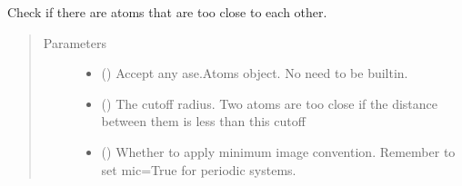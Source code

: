\documentclass[letterpaper,10pt,english]{sphinxmanual}
\begin{document}

\begin{fulllineitems}
\label{\detokenize{utilities:acat.utilities.atoms_too_close}}
Check if there are atoms that are too close to each other.
\begin{quote}\begin{description}
\item[{Parameters}] \leavevmode\begin{itemize}
\item {} 
 () \textendash{} Accept any ase.Atoms object. No need to be built\sphinxhyphen{}in.

\item {} 
 (\sphinxstyleliteralemphasis{\sphinxupquote{, }}) \textendash{} The cutoff radius. Two atoms are too close if the distance between
them is less than this cutoff

\item {} 
 (\sphinxstyleliteralemphasis{\sphinxupquote{, }}) \textendash{} Whether to apply minimum image convention. Remember to set
mic=True for periodic systems.

\end{itemize}

\end{description}\end{quote}

\end{fulllineitems}

\end{document}
